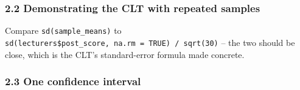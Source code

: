 \documentclass[11pt]{article}
\newenvironment{Shaded}{\begin{snugshade}}{\end{snugshade}}
\newcommand{\AttributeTok}[1]{\textcolor[rgb]{0.13,0.29,0.53}{#1}}
\newcommand{\CommentTok}[1]{\textcolor[rgb]{0.56,0.35,0.01}{\textit{#1}}}
\newcommand{\DecValTok}[1]{\textcolor[rgb]{0.00,0.00,0.81}{#1}}
\newcommand{\FunctionTok}[1]{\textcolor[rgb]{0.13,0.29,0.53}{\textbf{#1}}}
\newcommand{\NormalTok}[1]{#1}
\newcommand{\OtherTok}[1]{\textcolor[rgb]{0.56,0.35,0.01}{#1}}
\newcommand{\SpecialCharTok}[1]{\textcolor[rgb]{0.81,0.36,0.00}{\textbf{#1}}}
\newcommand{\StringTok}[1]{\textcolor[rgb]{0.31,0.60,0.02}{#1}}
\begin{document}
\hypertarget{demonstrating-the-clt-with-repeated-samples}{%
\subsubsection{2.2 Demonstrating the CLT with repeated
samples}\label{demonstrating-the-clt-with-repeated-samples}}

\begin{Shaded}
\end{Shaded}

Compare \texttt{sd(sample\_means)} to
\texttt{sd(lecturers\$post\_score,\ na.rm\ =\ TRUE)\ /\ sqrt(30)} -- the
two should be close, which is the CLT's standard-error formula made
concrete.

\hypertarget{one-confidence-interval}{%
\subsubsection{2.3 One confidence
interval}\label{one-confidence-interval}}
\end{document}
